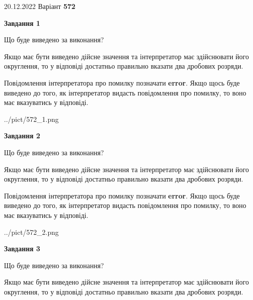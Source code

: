 \documentclass[12pt, ukrainian]{article}
\begin{document}
{20.12.2022 Варіант \No \textbf { 572 }\par}
{
\begin {Large}

{\begin {center}\textbf{Завдання 1}\end {center}}\par
Що буде виведено за виконання? \par

Якщо має бути виведено дійсне значення та інтерпретатор має здійснювати його округлення, 
то у відповіді достатньо правильно вказати два дробових розряди.

Повідомлення інтерпретатора про помилку позначати \textbf{error}.
Якщо щось буде виведено до того, як інтерпретатор видасть повідомлення про помилку, 
то воно має вказуватись у відповіді. \par

\begin{center}
	{../pict/572_1.png}
\end{center}
\newpage

{\begin {center}\textbf{Завдання 2}\end {center}}\par
Що буде виведено за виконання? \par

Якщо має бути виведено дійсне значення та інтерпретатор має здійснювати його округлення, 
то у відповіді достатньо правильно вказати два дробових розряди.

Повідомлення інтерпретатора про помилку позначати \textbf{error}.
Якщо щось буде виведено до того, як інтерпретатор видасть повідомлення про помилку, 
то воно має вказуватись у відповіді. \par

\begin{center}
	{../pict/572_2.png}
\end{center}
\newpage

{\begin {center}\textbf{Завдання 3}\end {center}}\par
Що буде виведено за виконання? \par

Якщо має бути виведено дійсне значення та інтерпретатор має здійснювати його округлення, 
то у відповіді достатньо правильно вказати два дробових розряди.


\end{Large}}
\end{document}
